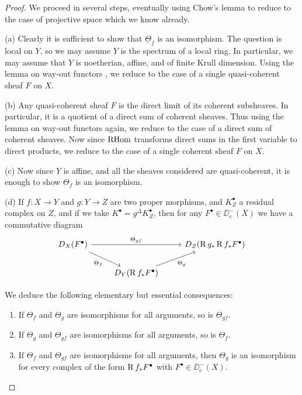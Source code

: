 \begin{proof}
We proceed in several steps, eventually using Chow's lemma to reduce to the case of projective space which we know already.

\medskip\noindent(a) Clearly it is sufficient to show that $\underline{\Theta}_{f}$ is an isomorphism. The question is local on $Y$, so we may assume $Y$ is the spectrum of a local ring. In particular, we may assume that $Y$ is noetherian, affine, and of finite Krull dimension. Using the lemma on way-out functors , we reduce to the case of a single quasi-coherent sheaf $F$ on $X$.

\medskip\noindent(b) Any quasi-coherent sheaf $F$ is the direct limit of its coherent subsheaves. In particular, it is a quotient of a direct sum of coherent sheaves. Thus using the lemma on way-out functors  again, we reduce to the case of a direct sum of coherent sheaves. Now since $\operatorname{RHom}$ transforms direct sums in the first variable to direct products, we reduce to the case of a single coherent sheaf $F$ on $X$.

\medskip\noindent(c) Now since $Y$ is affine, and all the sheaves considered are quasi-coherent, it is enough to show $\Theta_{f}$ is an isomorphism.

\medskip\noindent(d) If $f: X \to Y$ and $g: Y \to Z$ are two proper morphisms, and $K_{Z}^{\bullet}$ a residual complex on $Z$, and if we take $K^{\bullet} = g^{\Delta} K_{Z}^{\bullet}$, then for any $F^{\bullet} \in \DD_{\mathrm{c}}^{-}(X)$ we have a commutative diagram
\[
\begin{tikzcd}
	D_X(F^\bullet)
	\arrow[rr, "\Theta_{gf}"]
	\arrow[dr, "\Theta_f"']
	& & D_Z(\RR g_*\RR f_*F^\bullet) \\
	& D_Y(\RR f_*F^\bullet)
	\arrow[ur, "\Theta_g"']
\end{tikzcd}
\]

We deduce the following elementary but essential consequences:
\begin{enumerate}
\item[(i)] If $\Theta_{f}$ and $\Theta_{g}$ are isomorphisms for all arguments, so is $\Theta_{gf}$.
\item[(ii)] If $\Theta_{g}$ and $\Theta_{gf}$ are isomorphisms for all arguments, so is $\Theta_{f}$.
\item[(iii)] If $\Theta_{f}$ and $\Theta_{gf}$ are isomorphisms for all arguments, then $\Theta_{g}$ is an isomorphism for every complex of the form $\operatorname{R} f_{*}F^{\bullet}$ with $F^{\bullet} \in \DD_{\mathrm{c}}^{-}(X)$.
\end{enumerate}


\end{proof}
